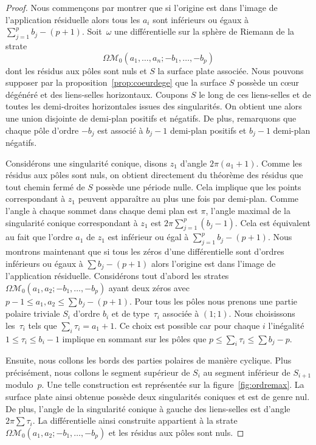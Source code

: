 \documentclass[JEP,XML,SOM,Unicode,francais,NoFloatCountersInSection,published]{cedram}
\let\mathcal\mathscr
\newcommand{\omoduli}[1][g]{{\Omega\mathcal M}_{\!#1}}
\theoremstyle{definition}
\begin{document}
\begin{proof}
Nous commençons par montrer que si l'origine est dans l'image de l'application résiduelle alors tous les $a_{i}$ sont inférieurs ou égaux à $\sum_{j=1}^p b_{j}-(p+1)$.
Soit~$\omega$ une différentielle sur la sphère de Riemann de la strate
\[
\omoduli[0](a_{1},\dots,a_{n};-b_{1},\dots,-b_{p})
\]
dont les résidus aux pôles sont nuls et $S$ la surface plate associée. Nous pouvons supposer par la proposition~\ref{prop:coeurdege} que la surface $S$ possède un cœur dégénéré et des liens-selles horizontaux. Coupons $S$ le long de ces liens-selles et de toutes les demi-droites horizontales issues des singularités. On obtient une alors une union disjointe de demi-plan positifs et négatifs. De plus, remarquons que chaque pôle d'ordre $-b_{j}$ est associé à $b_{j}-1$ demi-plan positifs et $b_{j}-1$ demi-plan négatifs.

Considérons une singularité conique, disons $z_{1}$ d'angle $2\pi(a_{1}+1)$. Comme les résidus aux pôles sont nuls, on obtient directement du théorème des résidus que tout chemin fermé de $S$ possède une période nulle.
Cela implique que les points correspondant à $z_{1}$ peuvent apparaître au plus une fois par demi-plan.
Comme l'angle à chaque sommet dans chaque demi plan est $\pi$, l'angle maximal de la singularité conique correspondant à $z_{1}$ est $2\pi\sum_{j=1}^p (b_{j}-1)$. Cela est équivalent au fait que l'ordre $a_{1}$ de $z_{1}$ est inférieur ou égal à $\sum_{j=1}^p b_{j}-(p+1)$.
Nous montrons maintenant que si tous les zéros d'une différentielle sont d'ordres inférieurs ou égaux à $\sum b_{j}-(p+1)$ alors l'origine est dans l'image de l'application résiduelle.
Considérons tout d'abord les strates $\omoduli[0]\left(a_{1},a_{2};-b_{1},\dots,-b_{p}\right)$ ayant deux zéros avec $p-1\leq a_{1},a_{2}\leq \sum b_{j} -(p+1)$. Pour tous les pôles nous prenons une partie polaire triviale $S_{i}$ d'ordre $b_{i}$ et de type~$\tau_{i}$ associée à $(1;1)$. Nous choisissons les~$\tau_{i}$ tels que $\sum_{i}\tau_{i}=a_{1}+1$. Ce choix est possible car pour chaque $i$ l'inégalité $1\leq \tau_{i} \leq b_{i}-1$ implique en sommant sur les pôles que $p\leq\sum_{i}\tau_{i}\leq \sum b_{j}-p$.

Ensuite, nous collons les bords des parties polaires de manière cyclique. Plus précisément, nous collons le segment supérieur de $S_{i}$ au segment inférieur de $S_{i+1}$ modulo~$p$. Une telle construction est représentée sur la figure~\ref{fig:ordremax}. La surface plate ainsi obtenue possède deux singularités coniques et est de genre nul. De plus, l'angle de la singularité conique à gauche des liens-selles est d'angle $2\pi\sum \tau_{i}$. La différentielle ainsi construite appartient à la strate $\omoduli[0]\left(a_{1},a_{2};-b_{1},\dots,-b_{p}\right)$ et les résidus aux pôles sont nuls.


\end{proof}
\end{document}
